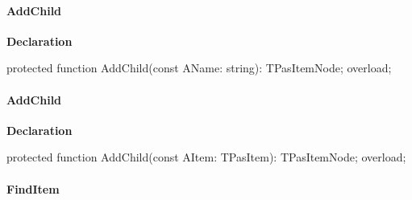 \documentclass{report}
\newif\ifpdf
\begin{document}
\paragraph*{AddChild}\hspace*{\fill}

\label{PasDoc_HierarchyTree.TPasItemNode-AddChild}
\begin{list}{}{
\setlength{\itemindent}{0cm}
\setlength{\listparindent}{0cm}
\setlength{\leftmargin}{\evensidemargin}
\addtolength{\leftmargin}{\tmplength}
\settowidth{\labelsep}{X}
\addtolength{\leftmargin}{\labelsep}
\setlength{\labelwidth}{\tmplength}
}
\item[\textbf{Declaration}\hfill]
\ifpdf
\begin{flushleft}
\fi
\begin{ttfamily}
protected function AddChild(const AName: string): TPasItemNode; overload;\end{ttfamily}

\ifpdf
\end{flushleft}
\fi

\end{list}
\paragraph*{AddChild}\hspace*{\fill}

\label{PasDoc_HierarchyTree.TPasItemNode-AddChild}
\begin{list}{}{
\setlength{\itemindent}{0cm}
\setlength{\listparindent}{0cm}
\setlength{\leftmargin}{\evensidemargin}
\addtolength{\leftmargin}{\tmplength}
\settowidth{\labelsep}{X}
\addtolength{\leftmargin}{\labelsep}
\setlength{\labelwidth}{\tmplength}
}
\item[\textbf{Declaration}\hfill]
\ifpdf
\begin{flushleft}
\fi
\begin{ttfamily}
protected function AddChild(const AItem: TPasItem): TPasItemNode; overload;\end{ttfamily}

\ifpdf
\end{flushleft}
\fi

\end{list}
\paragraph*{FindItem}\hspace*{\fill}
\end{document}
